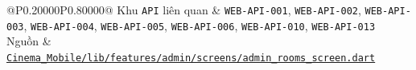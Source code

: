 \begin{longtable}{@{}P{0.20000\SRSWidth}P{0.80000\SRSWidth}@{}}
Khu \texttt{API} liên quan & \texttt{WEB-\allowbreak{}API-\allowbreak{}001}, \texttt{WEB-\allowbreak{}API-\allowbreak{}002}, \texttt{WEB-\allowbreak{}API-\allowbreak{}003}, \texttt{WEB-\allowbreak{}API-\allowbreak{}004}, \texttt{WEB-\allowbreak{}API-\allowbreak{}005}, \texttt{WEB-\allowbreak{}API-\allowbreak{}006}, \texttt{WEB-\allowbreak{}API-\allowbreak{}010}, \texttt{WEB-\allowbreak{}API-\allowbreak{}013} \\[3pt]
Nguồn & \href{../../../Cinema\_Mobile/lib/features/admin/screens/admin\_rooms\_screen.dart}{\texttt{Cinema\_\allowbreak{}Mobile/\allowbreak{}lib/\allowbreak{}features\allowbreak{}/\allowbreak{}admin/\allowbreak{}screens/\allowbreak{}admin\_\allowbreak{}rooms\_\allowbreak{}screen.\allowbreak{}dart}} \\[3pt]
\end{longtable}
\endgroup

